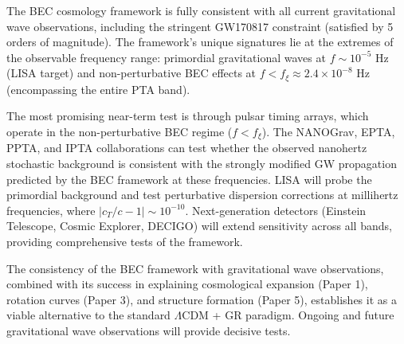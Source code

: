 \documentclass[11pt,a4paper]{article}
\newcommand{\cT}{\ensuremath{c_T}}
\theoremstyle{definition}
\theoremstyle{remark}
\begin{document}
The BEC cosmology framework is fully consistent with all current gravitational wave observations, including the stringent GW170817 constraint (satisfied by 5 orders of magnitude). The framework's unique signatures lie at the extremes of the observable frequency range: primordial gravitational waves at $f \sim 10^{-5}$ Hz (LISA target) and non-perturbative BEC effects at $f < f_\xi \approx 2.4 \times 10^{-8}$ Hz (encompassing the entire PTA band).

The most promising near-term test is through pulsar timing arrays, which operate in the non-perturbative BEC regime ($f < f_\xi$). The NANOGrav, EPTA, PPTA, and IPTA collaborations can test whether the observed nanohertz stochastic background is consistent with the strongly modified GW propagation predicted by the BEC framework at these frequencies. LISA will probe the primordial background and test perturbative dispersion corrections at millihertz frequencies, where $|\cT/c - 1| \sim 10^{-10}$. Next-generation detectors (Einstein Telescope, Cosmic Explorer, DECIGO) will extend sensitivity across all bands, providing comprehensive tests of the framework.

The consistency of the BEC framework with gravitational wave observations, combined with its success in explaining cosmological expansion (Paper 1), rotation curves (Paper 3), and structure formation (Paper 5), establishes it as a viable alternative to the standard $\Lambda$CDM + GR paradigm. Ongoing and future gravitational wave observations will provide decisive tests.
\end{document}
